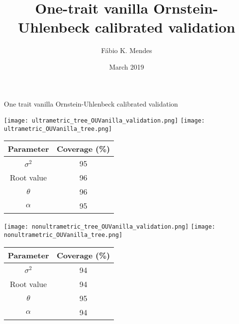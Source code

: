 \documentclass{article}
\title{One-trait vanilla Ornstein-Uhlenbeck calibrated validation}
\author{F\'{a}bio K. Mendes}
\date{March 2019}
\begin{document}
\centering
One trait vanilla Ornstein-Uhlenbeck calibrated validation

\begin{center}
  \texttt{[image: ultrametric\_tree\_OUVanilla\_validation.png]}
  \texttt{[image: ultrametric\_OUVanilla\_tree.png]}

  \begin{tabular}{c | c}
    Parameter & Coverage (\%) \\\hline
    $\sigma^2$ & 95\\
    Root value & 96\\
    $\theta$ & 96\\
    $\alpha$ & 95\\
  \end{tabular}
\end{center}

\newpage

\vspace{3cm}
\begin{center}
\texttt{[image: nonultrametric\_tree\_OUVanilla\_validation.png]}
\texttt{[image: nonultrametric\_OUVanilla\_tree.png]}

\begin{tabular}{c | c}
    Parameter & Coverage (\%) \\\hline
    $\sigma^2$ & 94\\
    Root value & 94\\
    $\theta$ & 95\\
    $\alpha$ & 94\\
\end{tabular}
\end{center}
\end{document}
